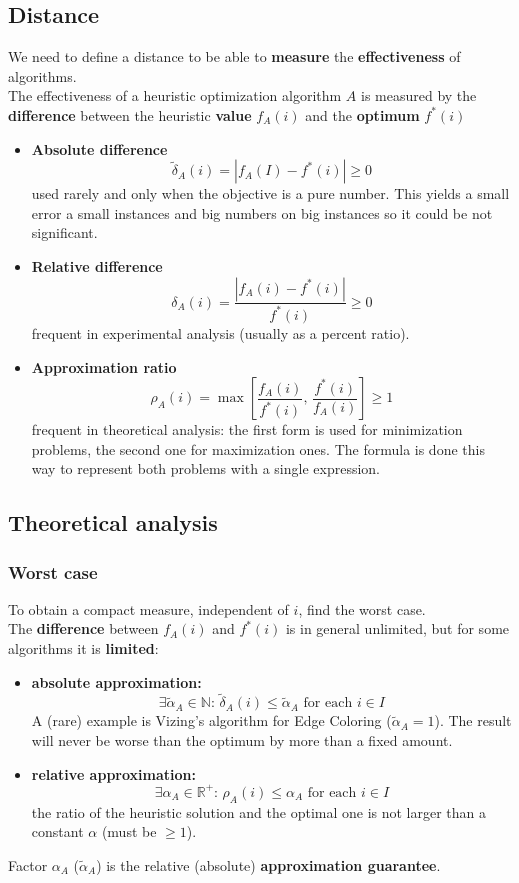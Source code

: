\subsection{Distance} 
We need to define a distance to be able to \textbf{measure} the \textbf{effectiveness} of algorithms.\\
The effectiveness of a heuristic optimization algorithm $A$ is measured by the \textbf{difference} between the heuristic \textbf{value} $f_A (i)$ and the \textbf{optimum} $f^\ast (i)$
\begin{itemize}
	\item \textbf{Absolute difference}
	$$ \tilde{\delta}_A (i) = |f_A(I) - f^\ast (i)| \geq 0 $$
	used rarely and only when the objective is a pure number. This yields a small error a small instances and big numbers on big instances so it could be not significant.\\
	\item \textbf{Relative difference}
	$$ \delta_A (i) = \frac{|f_A (i) - f^\ast (i)|}{f^\ast (i)} \geq 0$$
	frequent in experimental analysis (usually as a percent ratio).\\
	\item \textbf{Approximation ratio}
	$$ \rho_A (i) = \max \left[\frac{f_A(i)}{f^\ast(i)}, \, \frac{f^\ast (i)}{f_A (i)}\right] \geq 1 $$
	frequent in theoretical analysis: the first form is used for minimization problems, the second one for maximization ones. The formula is done this way to represent both problems with a single expression.\\
\end{itemize}

\newpage

\subsection{Theoretical analysis}
\subsubsection{Worst case}
To obtain a compact measure, independent of $i$, find the worst case.\\

The \textbf{difference} between $f_A (i)$ and $f^\ast(i)$ is in general unlimited, but for some algorithms it is \textbf{limited}:
\begin{itemize}
	\item \textbf{absolute approximation:}
	$$ \exists \tilde{\alpha}_A \in \mathbb{N} : \, \tilde{\delta}_A (i) \leq \tilde{\alpha}_A \text{ for each } i \in I $$
	A (rare) example is Vizing's algorithm for Edge Coloring ($\tilde{\alpha}_A = 1$). The result will never be worse than the optimum by more than a fixed amount.
	\item \textbf{relative approximation:}
	$$ \exists \alpha_A \in \mathbb{R}^+ : \, \rho_A (i) \leq \alpha_A \text{ for each } i \in I $$
	the ratio of the heuristic solution and the optimal one is not larger than a constant $\alpha$ (must be $\geq 1$).
\end{itemize}
Factor $\alpha_A$ ($\tilde{\alpha}_A$) is the relative (absolute) \textbf{approximation guarantee}.\\

